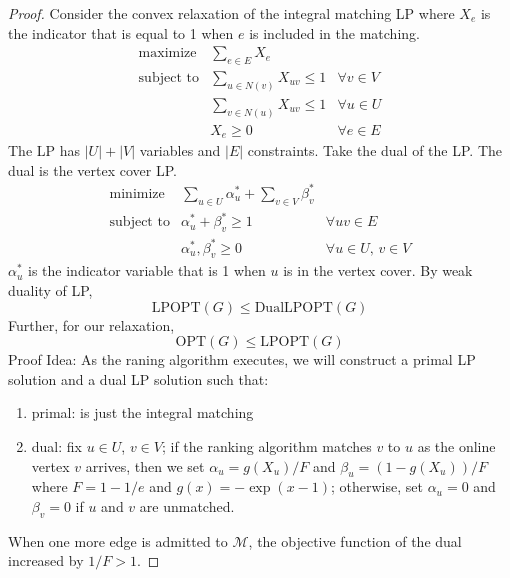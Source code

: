 \begin{proof}
    Consider the convex relaxation of the integral matching LP where $X_e$ is the indicator that is equal to 1 when $e$ is included in the matching.
    $$
    \begin{array}{llll}
        \text{maximize} & \sum_{e \in E} X_e \\
        \text{subject to} & \sum_{u \in N(v)} X_{uv} \leq 1 & \forall v \in V \\
        & \sum_{v \in N(u)} X_{uv} \leq 1 & \forall u \in U \\
        & X_e \geq 0 & \forall e \in E
    \end{array}
    $$
    The LP has $|U|+|V|$ variables and $|E|$ constraints. Take the dual of the LP. The dual is the vertex cover LP.
    $$
    \begin{array}{llll}
        \text{minimize} & \sum_{u \in U} \alpha_u^* + \sum_{v \in V} \beta_v^* \\
        \text{subject to} & \alpha_u^* + \beta_v^* \geq 1 & \forall uv \in E \\
        & \alpha_u^*,\beta_v^* \geq 0 & \forall u \in U,\, v \in V
    \end{array}
    $$
    $\alpha_u^*$ is the indicator variable that is 1 when $u$ is in the vertex cover. By weak duality of LP,
    $$
    \mathrm{LPOPT}(G) \leq \mathrm{DualLPOPT}(G)
    $$
    Further, for our relaxation,
    $$
    \mathrm{OPT}(G) \leq \mathrm{LPOPT}(G)
    $$
    Proof Idea: As the raning algorithm executes, we will construct a primal LP solution and a dual LP solution such that:
    \begin{enumerate}
        \item primal: is just the integral matching
        \item dual: fix $u \in U$, $v \in V$; if the ranking algorithm matches $v$ to $u$ as the online vertex $v$ arrives, then we set $\alpha_u = g(X_u)/F$ and $\beta_u = (1-g(X_u))/F$ where $F=1-1/e$ and $g(x) = -\exp(x-1)$; otherwise, set $\alpha_u = 0$ and $\beta_v = 0$ if $u$ and $v$ are unmatched. 
    \end{enumerate}
    When one more edge is admitted to $\mathcal{M}$, the objective function of the dual increased by $1/F > 1$.


\end{proof}

